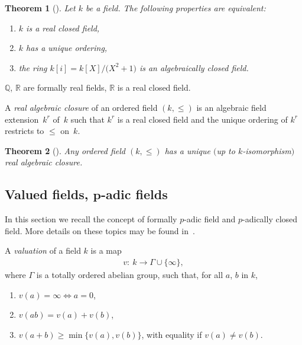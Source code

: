 \documentclass[10pt,a4paper]{amsart}
\numberwithin{equation}{section}
\newtheorem{Theorem}{Theorem}[section]
\newcommand{\R}{\mathbb{R}}
\newcommand{\Q}{\mathbb{Q}}
\begin{document}
\begin{Theorem}[{\cite[Theorem~1.2.2]{BCR}}]\label{realcl}
Let $k$ be a field. The following properties are equivalent:
\begin{enumerate}\itemsep=0pt
\item[$(i)$] $k$ is a real closed field,
\item[$(ii)$] $k$ has a unique ordering,
\item[$(iii)$] the ring $k[i]=k[X]/\big(X^2+1\big)$ is an algebraically closed field.
\end{enumerate}
\end{Theorem}

\begin{examples} $\Q$, $\R$ are formally real fields, $\R$ is a real closed field.
\end{examples}

\begin{Definition} A \emph{real algebraic closure} of an ordered field $(k,\leq)$ is an algebraic field extension~$k^r$ of~$k$ such that $k^r$ is a real closed field and the unique ordering of $k^r$ restricts to $\leq$ on~$k$.
\end{Definition}

\begin{Theorem}[{\cite[Theorem~3.10]{Pre}}] Any ordered field $(k,\leq)$ has a
unique $($up to $k$-isomorphism$)$ real algebraic closure.
\end{Theorem}

\subsection[Valued fields, p-adic fields]{Valued fields, $\boldsymbol p$-adic fields}

In this section we recall the concept of formally $p$-adic field and $p$-adically closed field. More details on these topics may be found in~\cite{PR}.

\begin{Definition} A \emph{valuation} of a field $k$ is a map
\begin{gather*}
v\colon\ k \rightarrow \Gamma \cup \{ \infty \},
\end{gather*}
where $\Gamma$ is a totally ordered abelian group, such that, for all $a$, $b$ in $k$,
\begin{enumerate}\itemsep=0pt
\item[$(1)$] $v(a)=\infty \Leftrightarrow a=0$,
\item[$(2)$] $v(ab)=v(a)+v(b)$,
\item[$(3)$] $v(a+b) \geq \min \{v(a),v(b)\}$, with equality if $v(a)\neq v(b)$.
\end{enumerate}
\end{Definition}
\end{document}
